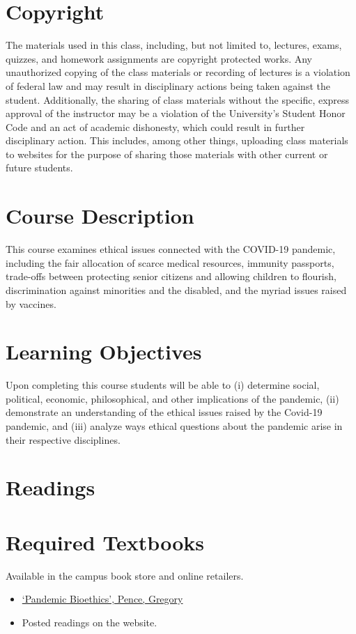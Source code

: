 \documentclass[article,oneside]{memoir}
\begin{document}
\section{Copyright}
The materials used in this class, including, but not limited to, lectures, exams, quizzes, and homework assignments are copyright protected works.  Any unauthorized copying of the class materials or recording of lectures is a violation of federal law and may result in disciplinary actions being taken against the student.  Additionally, the sharing of class materials without the specific, express approval of the instructor may be a violation of the University's Student Honor Code and an act of academic dishonesty, which could result in further disciplinary action.  This includes, among other things, uploading class materials to websites for the purpose of sharing those materials with other current or future students. 

\section{Course Description}

This course examines ethical issues connected with the COVID-19 pandemic, including the fair allocation of scarce medical resources, immunity passports, trade-offs between protecting senior citizens and allowing children to flourish, discrimination against minorities and the disabled, and the myriad issues raised by vaccines.

\section{Learning Objectives}

Upon completing this course students will be able to (i)  determine social, political, economic, philosophical, and other implications of the pandemic, (ii) demonstrate an understanding of the ethical issues raised by the Covid-19 pandemic, and (iii) analyze ways ethical questions about the pandemic arise in their respective disciplines.

\section{Readings}
\section{Required Textbooks}
Available in the campus book store and online retailers. 
\begin{itemize}
\item \href{https://broadviewpress.com/product/pandemic-bioethics/#tab-description}{`Pandemic Bioethics', Pence, Gregory}
\item Posted readings on the website.

\end{itemize}
\end{document}
